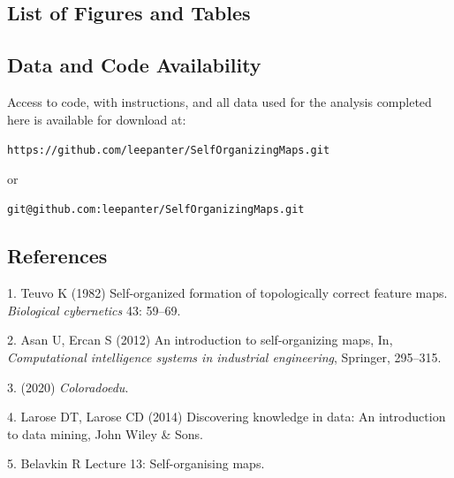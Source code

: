 \documentclass[12pt,]{article}
\begin{document}
\newpage

\hypertarget{list-of-figures-and-tables}{%
\subsection{List of Figures and
Tables}\label{list-of-figures-and-tables}}

\thispagestyle{empty}

\begin{singlespace}
\listoffigures
\listoftables
\end{singlespace}

\newpage

\hypertarget{data-and-code-availability}{%
\subsection{Data and Code
Availability}\label{data-and-code-availability}}

\thispagestyle{empty}

Access to code, with instructions, and all data used for the analysis
completed here is available for download at:

\texttt{https://github.com/leepanter/SelfOrganizingMaps.git}

or

\texttt{git@github.com:leepanter/SelfOrganizingMaps.git}

\hypertarget{references}{%
\subsection{References}\label{references}}



\hypertarget{refs}{}
\leavevmode\hypertarget{ref-teuvo1982self}{}%
1. Teuvo K (1982) Self-organized formation of topologically correct
feature maps. \emph{Biological cybernetics} 43: 59--69.

\leavevmode\hypertarget{ref-asan2012introduction}{}%
2. Asan U, Ercan S (2012) An introduction to self-organizing maps, In,
\emph{Computational intelligence systems in industrial engineering},
Springer, 295--315.

\leavevmode\hypertarget{ref-Grey_SelfOrganizing_2020}{}%
3. (2020) \emph{Coloradoedu}.

\leavevmode\hypertarget{ref-larose2014discovering}{}%
4. Larose DT, Larose CD (2014) Discovering knowledge in data: An
introduction to data mining, John Wiley \& Sons.

\leavevmode\hypertarget{ref-Belavkin}{}%
5. Belavkin R Lecture 13: Self-organising maps.
\end{document}
